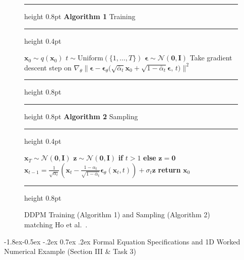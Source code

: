 \documentclass[10pt,a4paper]{article}
\makeatletter
\renewcommand\subsection{\@startsection{subsection}{2}{\z@}%
                                     {-1.8ex\@plus -0.5ex \@minus -.2ex}%
                                     {0.7ex \@plus .2ex}%
                                     {\normalfont\normalsize\bfseries}}
\makeatother
\begin{document}
\begin{figure}[htbp]
\begin{minipage}[t]{0.485\textwidth}
\vspace{0pt}
\hrule height 0.8pt\vspace{0.4em}
\noindent\textbf{Algorithm 1} Training
\vspace{0.3em}\hrule height 0.4pt\vspace{0.4em}
\begin{algorithmic}[1]
\Repeat
    \State $\mathbf{x}_0 \sim q(\mathbf{x}_0)$
    \State $t \sim \text{Uniform}(\{1, \dots, T\})$
    \State $\bm{\epsilon} \sim \mathcal{N}(\mathbf{0}, \mathbf{I})$
    \State Take gradient descent step on
    \Statex \quad $\nabla_\theta \big\|\bm{\epsilon} - \bm{\epsilon}_\theta\big(\sqrt{\bar{\alpha}_t}\mathbf{x}_0 + \sqrt{1 - \bar{\alpha}_t}\bm{\epsilon}, \, t\big)\big\|^2$
\end{algorithmic}
\vspace{0.4em}\hrule height 0.8pt
\end{minipage}
\hfill
\begin{minipage}[t]{0.485\textwidth}
\vspace{0pt}
\hrule height 0.8pt\vspace{0.4em}
\noindent\textbf{Algorithm 2} Sampling
\vspace{0.3em}\hrule height 0.4pt\vspace{0.4em}
\begin{algorithmic}[1]
\State $\mathbf{x}_T \sim \mathcal{N}(\mathbf{0}, \mathbf{I})$
    \State $\mathbf{z} \sim \mathcal{N}(\mathbf{0}, \mathbf{I})$ \textbf{if} $t > 1$ \textbf{else} $\mathbf{z} = \mathbf{0}$
    \State $\mathbf{x}_{t-1} = \frac{1}{\sqrt{\alpha_t}}\left(\mathbf{x}_t - \frac{1 - \alpha_t}{\sqrt{1 - \bar{\alpha}_t}}\bm{\epsilon}_\theta(\mathbf{x}_t, t)\right) + \sigma_t \mathbf{z}$
\EndFor
\State \textbf{return} $\mathbf{x}_0$
\end{algorithmic}
\vspace{1.55em}\hrule height 0.8pt
\end{minipage}
\caption{DDPM Training (Algorithm 1) and Sampling (Algorithm 2) matching Ho et al.\ \cite{ho2020denoising}.}
\label{fig:ddpm_algorithms}
\end{figure}

\subsection{Formal Equation Specifications and 1D Worked Numerical Example (Section III \& Task 3)}
\label{sec:method_worked_example}
\end{document}
